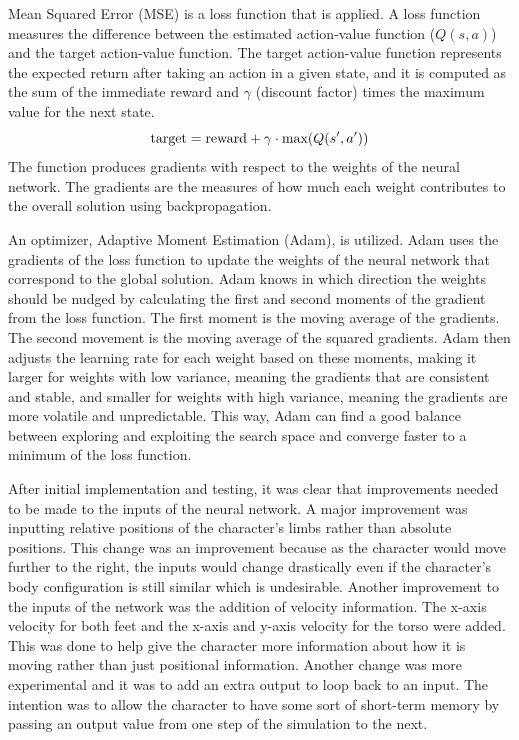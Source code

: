 \documentclass[letterpaper]{article} %
\begin{document}
\par Mean Squared Error (MSE) is a loss function that is applied. A loss function measures the difference between the estimated action-value function ($Q(s, a)$) and the target action-value function. The target action-value function represents the expected return after taking an action in a given state, and it is computed as the sum of the immediate reward and $\gamma$ (discount factor) times the maximum value for the next state.
$$
\textnormal{target} = \textnormal{reward} + \gamma \cdot \textnormal{max}(Q(s', a'))
$$
The function produces gradients with respect to the weights of the neural network. The gradients are the measures of how much each weight contributes to the overall solution using backpropagation.

\par An optimizer, Adaptive Moment Estimation (Adam), is utilized. Adam uses the gradients of the loss function to update the weights of the neural network that correspond to the global solution. Adam knows in which direction the weights should be nudged by calculating the first and second moments of the gradient from the loss function. The first moment is the moving average of the gradients. The second movement is the moving average of the squared gradients. Adam then adjusts the learning rate for each weight based on these moments, making it larger for weights with low variance, meaning the gradients that are consistent and stable, and smaller for weights with high variance, meaning the gradients are more volatile and unpredictable. This way, Adam can find a good balance between exploring and exploiting the search space and converge faster to a minimum of the loss function.

\par After initial implementation and testing, it was clear that improvements needed to be made to the inputs of the neural network. A major improvement was inputting relative positions of the character's limbs rather than absolute positions. This change was an improvement because as the character would move further to the right, the inputs would change drastically even if the character's body configuration is still similar which is undesirable. Another improvement to the inputs of the network was the addition of velocity information. The x-axis velocity for both feet and the x-axis and y-axis velocity for the torso were added. This was done to help give the character more information about how it is moving rather than just positional information. Another change was more experimental and it was to add an extra output to loop back to an input. The intention was to allow the character to have some sort of short-term memory by passing an output value from one step of the simulation to the next.
\end{document}
